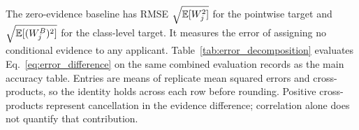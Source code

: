The zero-evidence baseline has RMSE $\sqrt{\mathbb E[W_j^2]}$ for the pointwise target and $\sqrt{\mathbb E[(W_j^B)^2]}$ for the class-level target. It measures the error of assigning no conditional evidence to any applicant. Table~\ref{tab:error_decomposition} evaluates Eq.~\eqref{eq:error_difference} on the same combined evaluation records as the main accuracy table. Entries are means of replicate mean squared errors and cross-products, so the identity holds across each row before rounding. Positive cross-products represent cancellation in the evidence difference; correlation alone does not quantify that contribution.
